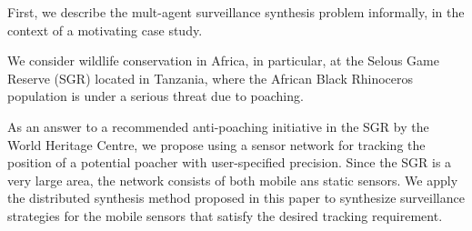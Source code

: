 First, we describe the mult-agent surveillance synthesis problem informally, in the context of a motivating case study. 

We consider wildlife conservation in Africa, in particular, at the Selous Game Reserve (SGR) located in Tanzania, where the African Black Rhinoceros population is under a serious threat due to poaching. 

As an answer to a recommended anti-poaching initiative in the SGR by the World Heritage Centre,  we propose using a sensor network for tracking the position of a potential poacher  with user-specified precision. Since the SGR is a very large area, the network consists of both mobile ans static sensors. We apply the  distributed synthesis method proposed in this paper to synthesize surveillance strategies for the mobile sensors that satisfy the desired tracking requirement.


